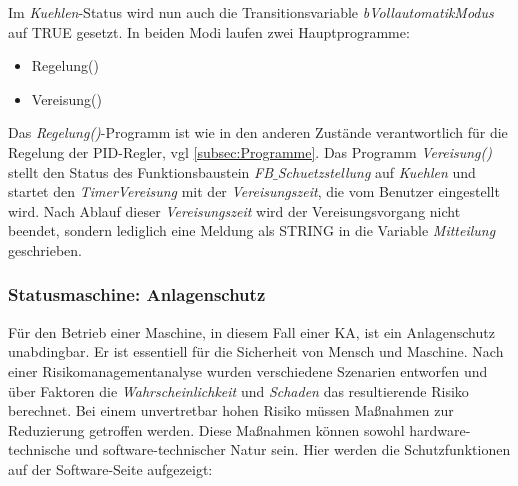 Im \textit{Kuehlen}-Status wird nun auch die Transitionsvariable \textit{bVollautomatikModus} auf TRUE gesetzt. In beiden Modi laufen zwei Hauptprogramme:

\begin{itemize}
\item	Regelung()
\item 	Vereisung()
\end{itemize}

Das \textit{Regelung()}-Programm ist wie in den anderen Zustände verantwortlich für die Regelung der PID-Regler, vgl \ref{subsec:Programme}. 
Das Programm \textit{Vereisung()} stellt den Status des Funktionsbaustein \textit{FB$\_$Schuetzstellung} auf \textit{Kuehlen} und startet den \textit{TimerVereisung} mit der \textit{Vereisungszeit}, die vom Benutzer eingestellt wird. Nach Ablauf dieser \textit{Vereisungszeit} wird der Vereisungsvorgang nicht beendet, sondern lediglich eine Meldung als STRING in die Variable \textit{Mitteilung} geschrieben. 

\subsubsection*{Statusmaschine: Anlagenschutz}
Für den Betrieb einer Maschine, in diesem Fall einer KA, ist ein Anlagenschutz unabdingbar. Er ist essentiell für die Sicherheit von Mensch und Maschine. Nach einer Risikomanagementanalyse wurden verschiedene Szenarien entworfen und über Faktoren die \textit{Wahrscheinlichkeit} und \textit{Schaden} das resultierende Risiko berechnet. 
Bei einem unvertretbar hohen Risiko müssen Maßnahmen zur Reduzierung getroffen werden. Diese Maßnahmen können sowohl hardware-technische und software-technischer Natur sein. Hier werden die Schutzfunktionen auf der Software-Seite aufgezeigt:

